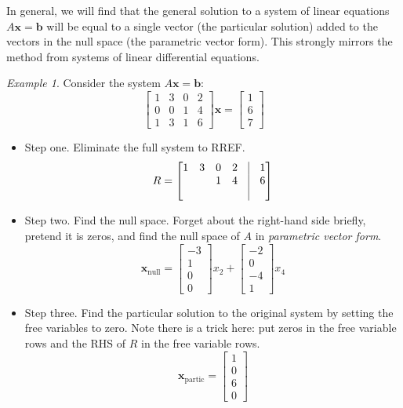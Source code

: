 \documentclass[11pt,oneside]{amsbook}
\theoremstyle{definition}
\theoremstyle{plain}
\theoremstyle{definition}
\theoremstyle{remark}
\newtheorem{example}[theorem]{Example}
\numberwithin{equation}{section}
\numberwithin{figure}{section}
\begin{document}
In general, we will find that the general solution to a system of linear equations $A\bm{x}=\bm{b}$ will be equal to a single vector (the particular solution) added to the vectors in the null space (the parametric vector form). This strongly mirrors the method from systems of linear differential equations.

\begin{example}
  Consider the system $A\bm{x}=\bm{b}$:
  \[\begin{bmatrix}
      1&3&0&2\\0&0&1&4\\1&3&1&6
    \end{bmatrix}
    \bm{x}=
    \begin{bmatrix}
      1\\6\\7
    \end{bmatrix}
  \]
  \begin{itemize}
  \item Step one. Eliminate the full system to RREF.
    \[R=\begin{bmatrix}
        1&3&0&2&\vline&1\\
        &&1&4&\vline&6\\
        &&&&\vline&
      \end{bmatrix}
    \]
  \item Step two. Find the null space. Forget about the right-hand side briefly, pretend it is zeros, and find the null space of $A$ in \emph{parametric vector form}.
  \[\bm{x}_{\mathrm{null}}
  =\begin{bmatrix}-3\\1\\0\\0\end{bmatrix}x_2
  +\begin{bmatrix}-2\\0\\-4\\1\end{bmatrix}x_4
  \]
  \item Step three. Find the particular solution to the original system by setting the free variables to zero. Note there is a trick here: put zeros in the free variable rows and the RHS of $R$ in the free variable rows.
  \[\bm{x}_{\mathrm{partic}}
  =\begin{bmatrix}1\\0\\6\\0\end{bmatrix}
\]
\end{itemize}
\end{example}
\end{document}
